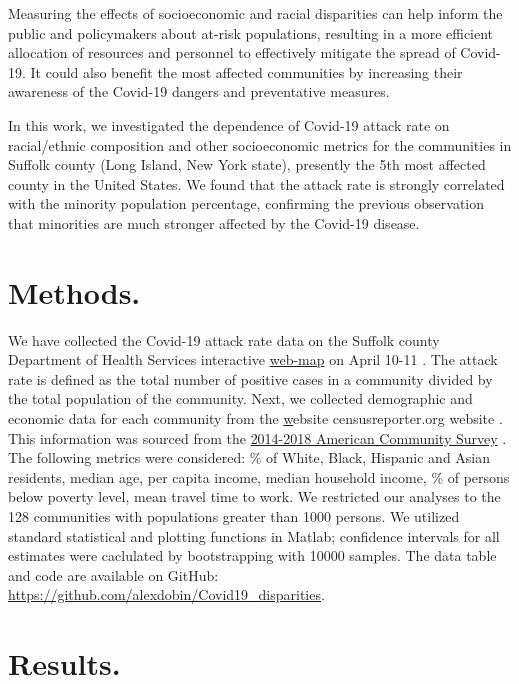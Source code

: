 \documentclass[twoside,12pt,onecolumn]{article}
\begin{document}
Measuring the effects of socioeconomic and racial disparities can help inform the public and policymakers about at-risk populations, resulting in a more efficient allocation of resources and personnel to effectively mitigate the spread of Covid-19. It could also benefit the most affected communities by increasing their awareness of the Covid-19 dangers and preventative measures.

In this work, we investigated the dependence of Covid-19 attack rate on racial/ethnic composition and other socioeconomic metrics for the communities in Suffolk county (Long Island, New York state), presently the 5th most affected county in the United States. We found that the attack rate is strongly correlated with the minority population percentage, confirming the previous observation that minorities are much stronger affected by the Covid-19 disease.

\section{Methods.}
We have collected the Covid-19 attack rate data on the Suffolk county Department of Health Services interactive \href{https://gis.suffolkcountyny.gov/portal/apps/opsdashboard/index.html#/76a26a0c83634266aa9efc35bd4f1975}{web-map} on April 10-11 \cite{SuffolkWebMap}.
The attack rate is defined as the total number of positive cases in a community divided by the total population of the community. Next, we collected demographic and economic data for each community from the \href{{censusreporter.org}}website {censusreporter.org} website \cite{CensusReporter}.
This information was sourced from the \href{https://www.census.gov/newsroom/press-releases/2019/acs-5-year.html}{2014-2018 American Community Survey} \cite{ACS}.  The following metrics were considered: \% of White, Black, Hispanic and Asian residents, median age, per capita income, median household income, \% of persons below poverty level, mean travel time to work.
We restricted our analyses to the 128 communities with populations greater than 1000 persons. We utilized standard statistical and plotting functions in Matlab; confidence intervals for all estimates were caclulated by bootstrapping with 10000 samples. The data table and code are available on GitHub: \url{https://github.com/alexdobin/Covid19_disparities}.

\section{Results.}
\end{document}
